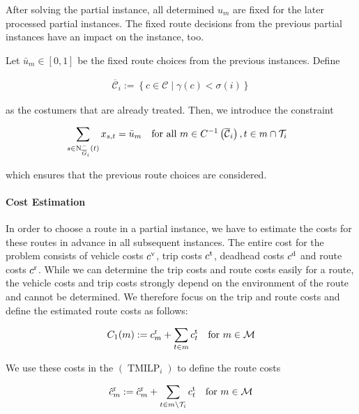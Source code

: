 After solving the partial instance, all determined $u_m$ are fixed for the later processed partial instances. The fixed route decisions from the previous partial instances have an impact on the instance, too. 

Let $\bar{u}_m\in[0,1]$ be the fixed route choices from the previous instances. Define

\begin{align}
	\overline{\mathcal{C}}_i := \left\{c\in\mathcal{C}\mid \gamma\left(c\right)<\sigma(i)\right\}
\end{align}

as the costumers that are already treated. Then, we introduce the constraint

\begin{align}
	&\sum_{s\in\operatorname{N}_{\overline{G}_i}^-(t)} x_{s,t} = \bar{u}_m && \text{for all } m\in C^{-1}\left(\overline{\mathcal{C}}_i\right), t\in m\cap\mathcal{T}_i \label{eq:TMILP:route_fix}
\end{align}

which ensures that the previous route choices are considered.

\paragraph{Cost Estimation} \parfill

In order to choose a route in a partial instance, we have to estimate the costs for these routes in advance in all subsequent instances. The entire cost for the problem consists of vehicle costs $c^{\operatorname{v}}$, trip costs $c^{\operatorname{t}}$, deadhead costs $c^{\operatorname{d}}$ and route costs $c^{\operatorname{r}}$. While we can determine the trip costs and route costs easily for a route, the vehicle costs and trip costs strongly depend on the environment of the route and cannot be determined. We therefore focus on the trip and route costs and define the estimated route costs as follows:

\begin{align*}
	C_1(m) := c^{\operatorname{r}}_m + \sum_{t\in m}c^{\operatorname{t}}_t && \text{for } m\in\mathcal{M}
\end{align*}

We use these costs in the $(\operatorname{TMILP}_i)$ to define the route costs

\begin{align*}
	\hat{c}^{\operatorname{r}}_m := \hat{c}^{\operatorname{r}}_m + \sum_{t\in m\backslash\mathcal{T}_i}c^{\operatorname{t}}_t && \text{for } m\in\mathcal{M}
\end{align*}

